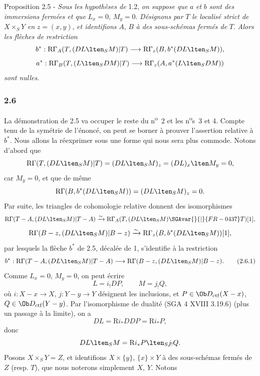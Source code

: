 \begin{statement}{Proposition 2.5 -}
\emph{Sous les hypothèses de} 1.2, \emph{on suppose que} $a$ \emph{et} $b$ \emph{sont des immersions fermées et que} $L_x=0$, $M_y=0$. \emph{Désignons par} $T$ \emph{le localisé strict de} $X\times_SY$ \emph{en} $z=(x,y)$, \emph{et identifions} $A$, $B$ \emph{à des sous-schémas fermés de} $T$. \emph{Alors les flèches de restriction}
\[
b^*:\mathrm{R}\Gamma_A(T,(DL\lten_SM)|T)
 \longrightarrow \mathrm{R}\Gamma_z(B,b^*(DL\lten_SM)),
\]
\[
a^*:\mathrm{R}\Gamma_B(T,(L\lten_SDM)|T)
 \longrightarrow \mathrm{R}\Gamma_z(A,a^*(L\lten_SDM))
\]
\emph{sont nulles}.
\end{statement}

\subsubsection*{2.6}
La démonstration de 2.5 va occuper le reste du n\textsuperscript{o}~2 et les n\textsuperscript{o}s~3 et 4. Compte tenu de la symétrie de l'énoncé, on peut se borner à prouver l'assertion relative à $b^*$. Nous allons la réexprimer sous une forme qui nous sera plus commode. Notons d'abord que
\[
\mathrm{R}\Gamma(T,(DL\lten_SM)|T)
 =(DL\lten_SM)_z
 =(DL)_x\lten M_y=0,
\]
car $M_y=0$, et que de même
\[
\mathrm{R}\Gamma(B,b^*(DL\lten_SM))
 =(DL\lten_SM)_z=0.
\]
Par suite, les triangles de cohomologie relative donnent des isomorphismes
\[
\mathrm{R}\Gamma(T-A,(DL\lten_SM)|T-A)
 \xrightarrow{\sim}
\mathrm{R}\Gamma_A(T,(DL\lten_SM)\SGAvar{}{|}{FR-0437}T)[1],
\]
\[
\mathrm{R}\Gamma(B-z,(DL\lten_SM)|B-z)
 \xrightarrow{\sim}
\mathrm{R}\Gamma_z(B,b^*(DL\lten_SM))[1],
\]
par lesquels la flèche $b^*$ de 2.5, décalée de 1, s'identifie à la restriction
\begin{equation}
b^*:\mathrm{R}\Gamma(T-A,(DL\lten_SM)|T-A)
 \longrightarrow \mathrm{R}\Gamma(B-z,(DL\lten_SM)|B-z).
\tag{2.6.1}
\end{equation}
Comme $L_x=0$, $M_y=0$, on peut écrire
\begin{equation}
L=i_!DP,\qquad M=j_!Q,
\tag{2.6.2}
\end{equation}
où $i:X-x\to X$, $j:Y-y\to Y$
désignent les inclusions, et $P\in\Ob D_{\mathrm{ctf}}(X-x)$, $Q\in\Ob D_{\mathrm{ctf}}(Y-y)$. Par l'isomorphisme de dualité (SGA 4 XVIII 3.19.6) (plus un passage à la limite), on a
\[
DL=\mathrm{R} i_*DDP=\mathrm{R} i_*P,
\]
donc
\[
DL\lten_SM=\mathrm{R} i_*P\lten_Sj_!Q.
\]
Posons $X\times_SY=Z$, et identifions $X\times\{y\}$, $\{x\}\times Y$ à des sous-schémas fermés de $Z$ (resp. $T$), que nous noterons simplement $X$, $Y$. Notons
